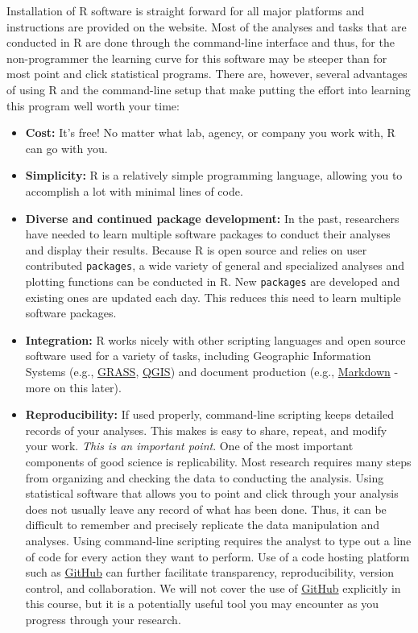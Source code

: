 \documentclass[
]{book}
\begin{document}
Installation of R software is straight forward for all major platforms and instructions are provided on the website. Most of the analyses and tasks that are conducted in R are done through the command-line interface and thus, for the non-programmer the learning curve for this software may be steeper than for most point and click statistical programs. There are, however, several advantages of using R and the command-line setup that make putting the effort into learning this program well worth your time:

\begin{itemize}
\item
  \textbf{Cost:} It's free! No matter what lab, agency, or company you work with, R can go with you.
\item
  \textbf{Simplicity:} R is a relatively simple programming language, allowing you to accomplish a lot with minimal lines of code.
\item
  \textbf{Diverse and continued package development:} In the past, researchers have needed to learn multiple software packages to conduct their analyses and display their results. Because R is open source and relies on user contributed \texttt{packages}, a wide variety of general and specialized analyses and plotting functions can be conducted in R. New \texttt{packages} are developed and existing ones are updated each day. This reduces this need to learn multiple software packages.
\item
  \textbf{Integration:} R works nicely with other scripting languages and open source software used for a variety of tasks, including Geographic Information Systems (e.g., \href{http://grass.osgeo.org}{GRASS}, \href{http://www.qgis.org}{QGIS}) and document production (e.g., \href{https://www.markdownguide.org/}{Markdown} - more on this later).
\item
  \textbf{Reproducibility:} If used properly, command-line scripting keeps detailed records of your analyses. This makes is easy to share, repeat, and modify your work. \emph{This is an important point}. One of the most important components of good science is replicability. Most research requires many steps from organizing and checking the data to conducting the analysis. Using statistical software that allows you to point and click through your analysis does not usually leave any record of what has been done. Thus, it can be difficult to remember and precisely replicate the data manipulation and analyses. Using command-line scripting requires the analyst to type out a line of code for every action they want to perform. Use of a code hosting platform such as \href{https://github.com/}{GitHub} can further facilitate transparency, reproducibility, version control, and collaboration. We will not cover the use of \href{https://github.com/}{GitHub} explicitly in this course, but it is a potentially useful tool you may encounter as you progress through your research.

\end{itemize}
\end{document}
